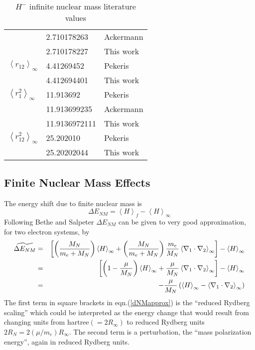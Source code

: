 \documentclass[12pt,thmsa]{article}
\begin{document}
\begin{table}[tbp]
\begin{tabular}{lll}
& 2.710178263 & {\footnotesize Ackermann}\cite{Ackermann95} \\ 
& 2.710178227 & {\footnotesize This work} \\ \hline
$\left\langle r_{12}\right\rangle _\infty $ & 4.41269452 & {\footnotesize %
Pekeris}\cite{Pekeris62} \\ 
& 4.412694401 & {\footnotesize This work} \\ \hline
$\left\langle r_1^2\right\rangle _\infty $ & 11.913692 & {\footnotesize %
Pekeris}\cite{Pekeris62} \\ 
& 11.913699235 & {\footnotesize Ackermann}\cite{Ackermann95} \\ 
& 11.9136972111 & {\footnotesize This work} \\ \hline
$\left\langle r_{12}^2\right\rangle _\infty $ & 25.202010 & {\footnotesize %
Pekeris}\cite{Pekeris62} \\ 
& 25.20202044 & {\footnotesize This work} \\ \hline\hline
\end{tabular}
\caption{$H^{-}$  infinite nuclear mass literature values \label{Litdata}}%
\end{table}%

\subsection{Finite Nuclear Mass Effects\label{nucmotian}\label{NMeffect}}

The energy shift due to finite nuclear mass is 
\begin{equation}
\Delta E_{NM}=\left\langle H\right\rangle _f-\left\langle H\right\rangle
_\infty   \label{dENM}
\end{equation}
Following Bethe and Salpeter\cite{BetheSalpeter} $\Delta E_{NM}$ can be
given to very good approximation, for two electron systems, by 
\begin{eqnarray}
\widetilde{\Delta E_{NM}} &=&\left[ \left( \frac{M_N}{m_e+M_N}\right)
\left\langle H\right\rangle _\infty +\left( \frac{M_N}{m_e+M_N}\right) \frac{%
m_e}{M_N}\left\langle \nabla _1\cdot \nabla _2\right\rangle _\infty \right]
-\left\langle H\right\rangle _\infty   \nonumber \\
&=&\left[ \left( 1-\frac \mu {M_N}\right) \left\langle H\right\rangle
_\infty +\frac \mu {M_N}\left\langle \nabla _1\cdot \nabla _2\right\rangle
_\infty \right] -\left\langle H\right\rangle _\infty   \nonumber \\
&=&-\frac \mu {M_N}\left( \left\langle H\right\rangle _\infty -\left\langle
\nabla _1\cdot \nabla _2\right\rangle _\infty \right)   \label{dNMapprox}
\end{eqnarray}
The first term in square brackets in eqn.(\ref{dNMapprox}) is the ``reduced
Rydberg scaling'' which could be interpreted as the energy change that would
result from changing units from hartree$(=2R_\infty )$ to reduced Rydberg
units $2R_N=2(\mu /m_e)R_\infty $. The second term is a perturbation, the
``mass polarization energy'', again in reduced Rydberg units.
\end{document}
